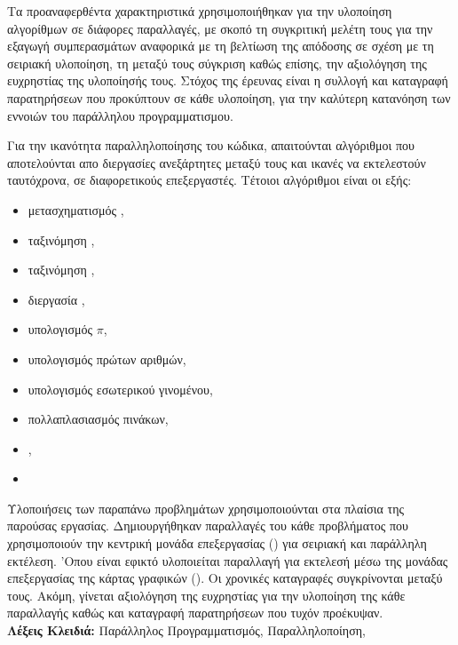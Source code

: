 Τα προαναφερθέντα χαρακτηριστικά χρησιμοποιήθηκαν για την υλοποίηση αλγορίθμων σε διάφορες
παραλλαγές, με σκοπό τη συγκριτική μελέτη τους για την εξαγωγή συμπερασμάτων αναφορικά με τη
βελτίωση της απόδοσης σε σχέση με τη σειριακή υλοποίηση, τη μεταξύ τους σύγκριση καθώς επίσης, την
αξιολόγηση της ευχρηστίας της υλοποίησής τους. Στόχος της έρευνας είναι η συλλογή και καταγραφή
παρατηρήσεων που προκύπτουν σε κάθε υλοποίηση, για την καλύτερη κατανόηση των εννοιών του παράλληλου
προγραμματισμου.

Για την ικανότητα παραλληλοποίησης του κώδικα, απαιτούνται αλγόριθμοι που αποτελούνται απο διεργασίες
ανεξάρτητες μεταξύ τους και ικανές να εκτελεστούν ταυτόχρονα, σε διαφορετικούς επεξεργαστές. Τέτοιοι
αλγόριθμοι είναι οι εξής:

\begin{itemize}
    \item μετασχηματισμός \textbf{}, 
    \item ταξινόμηση \textbf{},
    \item ταξινόμηση \textbf{},
    \item διεργασία \textbf{},
    \item υπολογισμός $\pi$, 
    \item υπολογισμός πρώτων αριθμών,
    \item υπολογισμός εσωτερικού γινομένου,
    \item πολλαπλασιασμός πινάκων,
    \item {},
    \item {}
\end{itemize}

Υλοποιήσεις των παραπάνω προβλημάτων χρησιμοποιούνται στα πλαίσια της παρούσας εργασίας.
Δημιουργήθηκαν παραλλαγές του κάθε προβλήματος που χρησιμοποιούν την κεντρική μονάδα επεξεργασίας
(\textbf{}) για σειριακή και παράλληλη εκτέλεση. 'Οπου είναι εφικτό υλοποιείται παραλλαγή
για εκτελεσή μέσω της μονάδας επεξεργασίας της κάρτας γραφικών (\textbf{}). Οι χρονικές
καταγραφές συγκρίνονται μεταξύ τους. Ακόμη, γίνεται αξιολόγηση της ευχρηστίας για την υλοποίηση της
κάθε παραλλαγής καθώς και καταγραφή παρατηρήσεων που τυχόν προέκυψαν.\\[1 cm]

\indent \textbf{Λέξεις Κλειδιά:} Παράλληλος Προγραμματισμός, Παραλληλοποίηση, 

